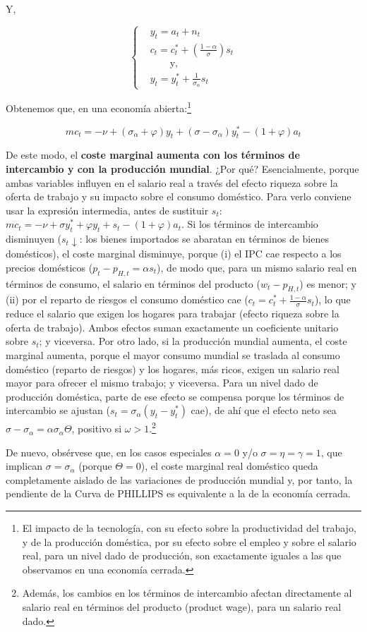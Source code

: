 \documentclass[10pt,a4paper]{article}
\begin{document}
Y,

$$\left\{\begin{aligned}
    &y_t=a_t+n_t\\
    &c_t=c_t^*+\left(\frac{1-\alpha}{\sigma}\right)s_t\\
    &\hspace{2em}\text{y,}\\
    &y_t=y_t^*+\frac{1}{\sigma_\alpha}s_t
\end{aligned}\right.$$


Obtenemos que, en una economía abierta:\footnote{
  El impacto de la tecnología, con su efecto sobre la productividad del trabajo, y de la producción doméstica, por su efecto sobre el empleo y sobre el salario real, para un nivel dado de producción, son exactamente iguales a las que observamos en una economía cerrada.
}

$$mc_t=-\nu+(\sigma_\alpha+\varphi)y_t+(\sigma-\sigma_\alpha)y_t^*-(1+\varphi)a_t$$

De este modo, el \textbf{coste marginal aumenta con los términos de intercambio y con la producción mundial}. ¿Por qué? Esencialmente, porque ambas variables influyen en el salario real a través del efecto riqueza sobre la oferta de trabajo y su impacto sobre el consumo doméstico. Para verlo conviene usar la expresión intermedia, antes de sustituir $s_t$: $mc_t=-\nu+\sigma y_t^*+\varphi y_t+s_t-(1+\varphi)a_t$. Si los términos de intercambio disminuyen ($s_t\downarrow$: los bienes importados se abaratan en términos de bienes domésticos), el coste marginal disminuye, porque (i) el IPC cae respecto a los precios domésticos ($p_t-p_{H,t}=\alpha s_t$), de modo que, para un mismo salario real en términos de consumo, el salario en términos del producto ($w_t-p_{H,t}$) es menor; y (ii) por el reparto de riesgos el consumo doméstico cae ($c_t=c_t^*+\frac{1-\alpha}{\sigma}s_t$), lo que reduce el salario que exigen los hogares para trabajar (efecto riqueza sobre la oferta de trabajo). Ambos efectos suman exactamente un coeficiente unitario sobre $s_t$; y viceversa. Por otro lado, si la producción mundial aumenta, el coste marginal aumenta, porque el mayor consumo mundial se traslada al consumo doméstico (reparto de riesgos) y los hogares, más ricos, exigen un salario real mayor para ofrecer el mismo trabajo; y viceversa. Para un nivel dado de producción doméstica, parte de ese efecto se compensa porque los términos de intercambio se ajustan ($s_t=\sigma_\alpha(y_t-y_t^*)$ cae), de ahí que el efecto neto sea $\sigma-\sigma_\alpha=\alpha\sigma_\alpha\Theta$, positivo si $\omega>1$.\footnote{
  Además, los cambios en los términos de intercambio afectan directamente al salario real en términos del producto (product wage), para un salario real dado. 
}

De nuevo, obsérvese que, en los casos especiales $\alpha = 0$ y/o $\sigma = \eta = \gamma = 1$, que implican $\sigma = \sigma_\alpha$ (porque $\Theta=0$), el coste marginal real doméstico queda completamente aislado de las variaciones de producción mundial y, por tanto, la pendiente de la Curva de PHILLIPS es equivalente a la de la economía cerrada.
\end{document}
